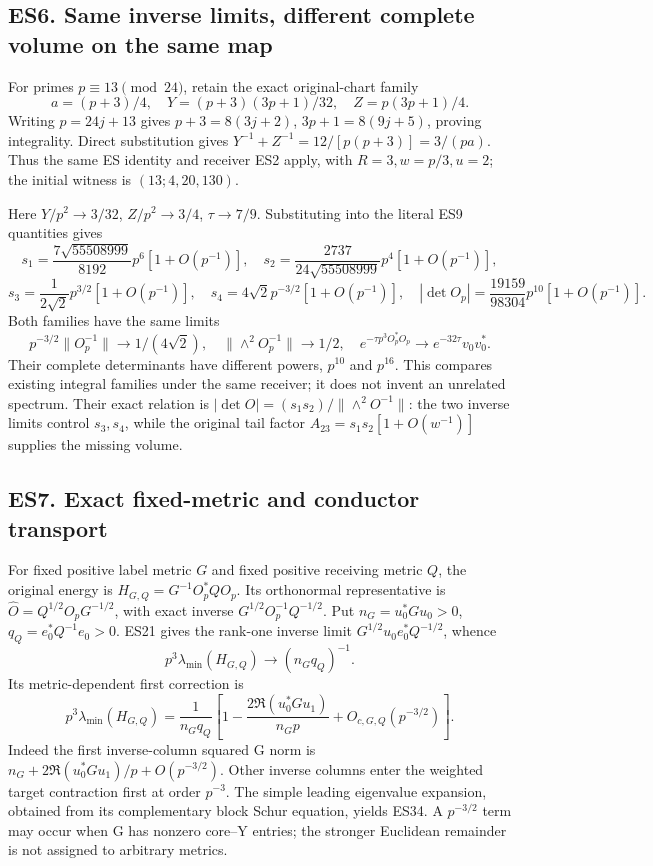 \documentclass[11pt]{article}
\begin{document}
\subsection{ES6. Same inverse limits, different complete volume on the same map}\label{es6.-same-inverse-limits-different-complete-volume-on-the-same-map}

For primes \(p\equiv13\pmod{24}\), retain the exact original-chart family \[
a=(p+3)/4,\quad Y=(p+3)(3p+1)/32,\quad Z=p(3p+1)/4.
\tag{ES30}
\] Writing \(p=24j+13\) gives \(p+3=8(3j+2)\), \(3p+1=8(9j+5)\), proving integrality. Direct substitution gives \(Y^{-1}+Z^{-1}=12/[p(p+3)]=3/(pa)\). Thus the same ES identity and receiver ES2 apply, with \(R=3,w=p/3,u=2\); the initial witness is \((13;4,20,130)\).

Here \(Y/p^2\to3/32\), \(Z/p^2\to3/4\), \(\tau\to7/9\). Substituting into the literal ES9 quantities gives \[
s_1=\frac{7\sqrt{55508999}}{8192}p^6[1+O(p^{-1})],\quad
s_2=\frac{2737}{24\sqrt{55508999}}p^4[1+O(p^{-1})],
\] \[
s_3=\frac1{2\sqrt2}p^{3/2}[1+O(p^{-1})],\quad
s_4=4\sqrt2p^{-3/2}[1+O(p^{-1})],\quad
|\det O_p|=\frac{19159}{98304}p^{10}[1+O(p^{-1})].
\tag{ES31}
\] Both families have the same limits \[
p^{-3/2}\|O_p^{-1}\|\to1/(4\sqrt2),\quad
\|\wedge^2O_p^{-1}\|\to1/2,\quad
e^{-\tau p^3O_p^*O_p}\to e^{-32\tau}v_0v_0^*.
\tag{ES32}
\] Their complete determinants have different powers, \(p^{10}\) and \(p^{16}\). This compares existing integral families under the same receiver; it does not invent an unrelated spectrum. Their exact relation is \(|\det O|=(s_1s_2)/\|\wedge^2O^{-1}\|\): the two inverse limits control \(s_3,s_4\), while the original tail factor \(A_{23}=s_1s_2[1+O(w^{-1})]\) supplies the missing volume.

\subsection{ES7. Exact fixed-metric and conductor transport}\label{es7.-exact-fixed-metric-and-conductor-transport}

For fixed positive label metric \(G\) and fixed positive receiving metric \(Q\), the original energy is \(H_{G,Q}=G^{-1}O_p^*QO_p\). Its orthonormal representative is \(\widehat O=Q^{1/2}O_pG^{-1/2}\), with exact inverse \(G^{1/2}O_p^{-1}Q^{-1/2}\). Put \(n_G=u_0^*Gu_0>0\), \(q_Q=e_0^*Q^{-1}e_0>0\). ES21 gives the rank-one inverse limit \(G^{1/2}u_0e_0^*Q^{-1/2}\), whence \[
p^3\lambda_{\min}(H_{G,Q})\longrightarrow(n_Gq_Q)^{-1}.
\tag{ES33}
\] Its metric-dependent first correction is \[
\boxed{p^3\lambda_{\min}(H_{G,Q})
=\frac1{n_Gq_Q}\left[1-\frac{2\Re(u_0^*Gu_1)}{n_Gp}+O_{c,G,Q}(p^{-3/2})\right].}
\tag{ES34}
\] Indeed the first inverse-column squared G norm is \(n_G+2\Re(u_0^*Gu_1)/p+O(p^{-3/2})\). Other inverse columns enter the weighted target contraction first at order \(p^{-3}\). The simple leading eigenvalue expansion, obtained from its complementary block Schur equation, yields ES34. A \(p^{-3/2}\) term may occur when G has nonzero core--Y entries; the stronger Euclidean remainder is not assigned to arbitrary metrics.
\end{document}
